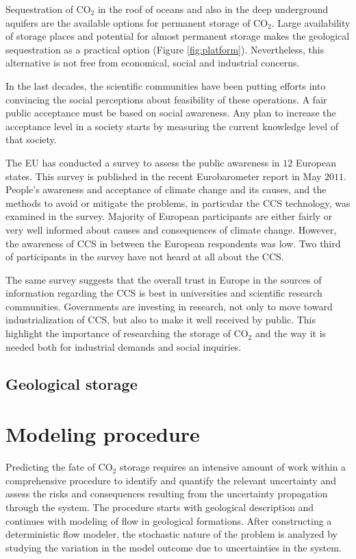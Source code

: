 Sequestration of CO$_2$ in the roof of oceans and also in the deep underground aquifers are the available options for permanent storage of $\mbox{CO}_2$. Large availability of storage places and potential for almost permanent storage makes the geological sequestration as a practical option (Figure \ref{fig:platform}). Nevertheless, this alternative is not free from economical, social and industrial concerns.  

In the last decades, the scientific communities have been putting efforts into convincing the social perceptions about feasibility of these operations. A fair public acceptance must be based on social awareness. Any plan to increase the acceptance level in a society starts by measuring the current knowledge level of that society. 

The EU has conducted a survey to assess the public awareness in $12$ European states. This survey is published in the recent Eurobarometer report in May $2011$. People's awareness and acceptance of climate change and its causes, and the methods to avoid or mitigate the problems, in particular the CCS technology, was examined in the survey. Majority of European participants are either fairly or very well informed about causes and consequences of climate change. However, the awareness of CCS in between the European respondents was low. Two third of participants in the survey have not heard at all about the CCS. 

The same survey suggests that the overall trust in Europe in the sources of information regarding the CCS is best in universities and scientific research communities. Governments are investing in research, not only to move toward industrialization of CCS, but also to make it well received by public. This highlight the importance of researching the storage of $\mbox{CO}_2$ and the way it is needed both for industrial demands and social inquiries.
\subsection{Geological storage}



\section{Modeling procedure}

Predicting the fate of $\mbox{CO}_2$ storage requires an intensive amount of work within a comprehensive procedure to identify and quantify the relevant uncertainty and assess the risks and consequences resulting from the uncertainty propagation through the system. The procedure starts with geological description and continues with modeling of flow in geological formations. After constructing a deterministic flow modeler, the stochastic nature of the problem is analyzed by studying the variation in the model outcome due to uncertainties in the system. 

